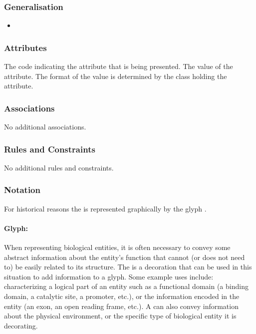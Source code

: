 \subsubsection{Generalisation}

\begin{itemize}
\item {}
\end{itemize}

\subsubsection{Attributes}

\begin{attributes}
   The code indicating the attribute that is
  being presented.
   The value of the attribute. The format of
  the value is determined by the class holding the attribute.
\end{attributes}

\subsubsection{Associations}

No additional associations.

\subsubsection{Rules and Constraints}

No additional rules and constraints.

\subsubsection{Notation}

For historical reasons the  is represented
graphically by the glyph .

\paragraph{Glyph: }
\label{sec:techref:unitInfo}

When representing biological entities, it is often necessary to convey
some abstract information about the entity's function that cannot (or
does not need to) be easily related to its structure.  The  is a decoration that can be used in this situation
to add information to a glyph.  Some example uses include:
characterizing a logical part of an entity such as a functional domain
(a binding domain, a catalytic site, a promoter, etc.), or the
information encoded in the entity (an exon, an open reading frame,
etc.).  A  can also convey information
about the physical environment, or the specific type of biological
entity it is decorating.

